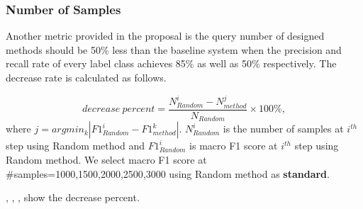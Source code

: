 \subsubsection{Number of Samples}
Another metric provided in the proposal is the query number of designed methods should be 50\% less than the baseline system when the precision and recall rate of every label class achieves 85\% as well as 50\% respectively. The decrease rate is calculated as follows.

$$decrease\ percent = \frac{N_{Random}^{i}-N_{method}^{j}}{N_{Random}} \times 100\%,$$
where $j = argmin_{k} |F1_{Random}^{i} - F1_{method}^{k}|$. $N_{Random}^{i}$ is the number of samples at $i^{th}$ step using Random method and $F1_{Random}^{i}$ is macro F1 score at $i^{th}$ step using Random method.  We select macro F1 score at \#samples=1000,1500,2000,2500,3000 using Random method as \textbf{standard}.

,  , , show the decrease percent.


